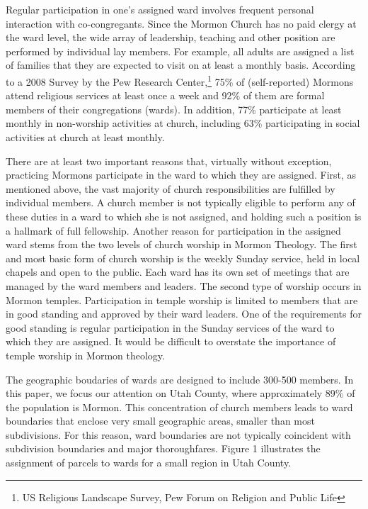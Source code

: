 \documentclass[12pt]{article}
\begin{document}
    Regular participation in one's assigned ward involves frequent personal interaction with
    co-congregants. Since the Mormon Church has no paid clergy at the ward level, the wide array of leadership, teaching and other position are performed by individual lay
    members. For example, all adults are assigned a list of families that they are expected to visit on at least a monthly basis. According to a 2008
    Survey by the Pew Research Center,\footnote{US Religious Landscape Survey, Pew Forum on Religion  and Public Life} 75\% of (self-reported) Mormons
    attend religious services at least once a week and 92\% of them are formal members of their congregations (wards). In addition, 77\% participate
    at least monthly
    in non-worship activities at church, including  63\% participating in social activities at church at least monthly.

    There are at least two important reasons that, virtually without exception, practicing Mormons participate in the ward to which
    they are assigned. First, as mentioned above, the vast majority of church responsibilities are fulfilled by individual members. A church member is
    not typically eligible to perform any of these duties in a ward to which she is not assigned, and holding such a position is a
    hallmark of full fellowship.  Another reason for participation in the assigned ward stems from the two levels of church worship in Mormon Theology. The first and most basic form of
    church worship is the weekly Sunday service, held in local chapels and open to the public. Each
    ward has its own set of meetings that are managed by the ward members and leaders. The second type of worship occurs in Mormon temples.
    Participation in temple worship is limited to members that are in good standing and approved by their ward leaders. One of the requirements for good
    standing is regular participation in the Sunday services of the ward to which they are assigned. It would be difficult to overstate the importance of temple worship in Mormon theology.

    The geographic boudaries of wards are designed to include 300-500 members. In this paper, we focus our attention on Utah County, where
    approximately
    89\% of the population is Mormon. This concentration of church members leads to ward boundaries that enclose very small geographic areas, smaller
    than most subdivisions.  For this reason, ward boundaries are not typically coincident with subdivision boundaries and major thoroughfares.
    Figure 1 illustrates the assignment of parcels to wards for a small region in Utah County.
\end{document}
